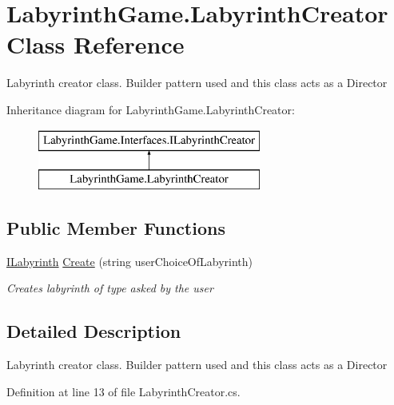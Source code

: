 \hypertarget{class_labyrinth_game_1_1_labyrinth_creator}{\section{Labyrinth\+Game.\+Labyrinth\+Creator Class Reference}
\label{class_labyrinth_game_1_1_labyrinth_creator}
}


Labyrinth creator class. Builder pattern used and this class acts as a Director  


Inheritance diagram for Labyrinth\+Game.\+Labyrinth\+Creator\+:\begin{figure}[H]
\begin{center}
\leavevmode
\includegraphics[height=2.000000cm]{class_labyrinth_game_1_1_labyrinth_creator}
\end{center}
\end{figure}
\subsection*{Public Member Functions}
\begin{DoxyCompactItemize}
\item 
\hyperlink{interface_labyrinth_game_1_1_interfaces_1_1_i_labyrinth}{I\+Labyrinth} \hyperlink{class_labyrinth_game_1_1_labyrinth_creator_a5159143053a5877414b8b68561e76a4a}{Create} (string user\+Choice\+Of\+Labyrinth)
\begin{DoxyCompactList}\small\item\em Creates labyrinth of type asked by the user \end{DoxyCompactList}\end{DoxyCompactItemize}


\subsection{Detailed Description}
Labyrinth creator class. Builder pattern used and this class acts as a Director 



Definition at line 13 of file Labyrinth\+Creator.\+cs.



